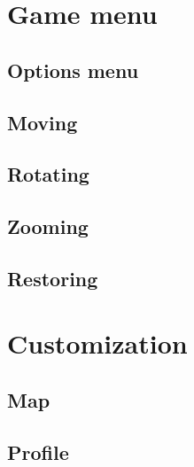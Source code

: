 \documentclass[12pt,a4paper]{article}
\begin{document}
\section{Game menu}
\subsection{Options menu}
\subsection{Moving}
\subsection{Rotating}
\subsection{Zooming}
\subsection{Restoring}

\section{Customization}
\subsection{Map}
\subsection{Profile}
\end{document}
